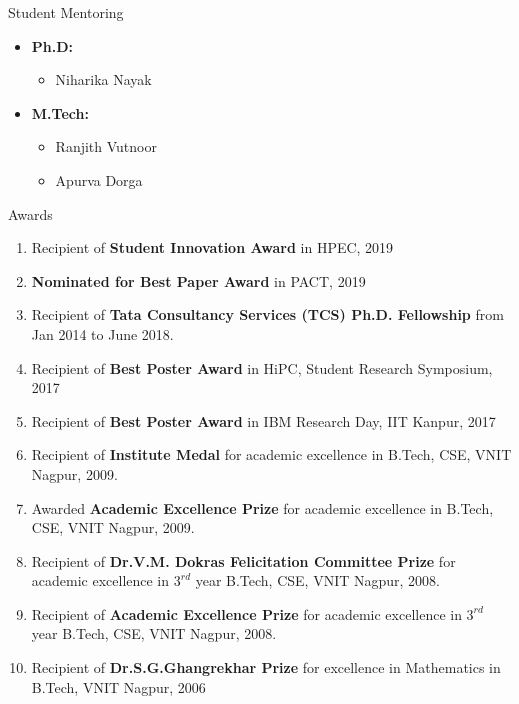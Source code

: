 \documentclass{resume} %
\begin{document}
\begin{rSection}{Student Mentoring}
	\begin{itemize}
		\item \textbf{Ph.D:}
		\begin{itemize}
			\item Niharika Nayak
		\end{itemize}
		\item \textbf{M.Tech:}
		\begin{itemize}
			\item Ranjith Vutnoor
			\item Apurva Dorga
		\end{itemize}
	\end{itemize}
\end{rSection}


\begin{rSection}{Awards}
	\begin{enumerate}
		\item Recipient of \textbf{Student Innovation Award} in HPEC, 2019
		\item \textbf{Nominated for Best Paper Award} in PACT, 2019
		\item Recipient of \textbf{Tata Consultancy Services (TCS) Ph.D. Fellowship} from Jan 2014 to June 2018.
		\item Recipient of \textbf{Best Poster Award} in HiPC, Student Research Symposium, 2017
		\item Recipient of \textbf{Best Poster Award} in IBM Research Day, IIT Kanpur, 2017
		\item Recipient of \textbf{Institute Medal} for academic excellence in B.Tech, CSE, VNIT Nagpur, 2009.
		\item Awarded \textbf{Academic Excellence Prize} for academic excellence in B.Tech, CSE, VNIT Nagpur, 2009.
		\item Recipient of \textbf{Dr.V.M. Dokras Felicitation Committee Prize} for academic excellence in $3^{rd}$ year B.Tech, CSE, VNIT Nagpur, 2008.
		\item Recipient of \textbf{Academic Excellence Prize} for academic excellence in $3^{rd}$ year B.Tech, CSE, VNIT Nagpur, 2008.
		\item Recipient of \textbf{Dr.S.G.Ghangrekhar Prize} for excellence in Mathematics in B.Tech, VNIT Nagpur, 2006
	\end{enumerate}
\end{rSection}
\end{document}
